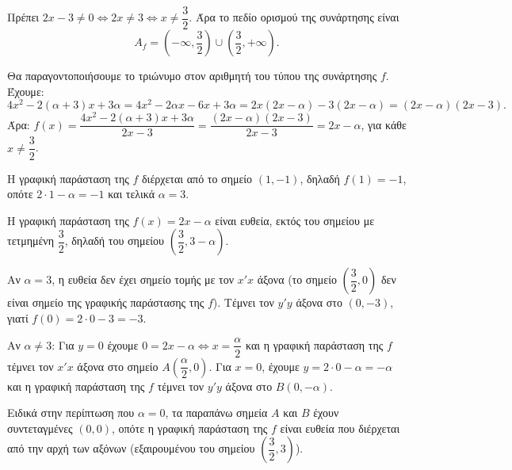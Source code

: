 
\begin{alist}
\item Πρέπει $2x - 3 \ne 0 \Leftrightarrow 2x \ne 3 \Leftrightarrow x \ne \dfrac{3}{2}$. Άρα το πεδίο ορισμού της συνάρτησης είναι
\[A_f = \left(-\infty, \dfrac{3}{2}\right) \cup \left(\dfrac{3}{2}, +\infty\right).\]

\item Θα παραγοντοποιήσουμε το τριώνυμο στον αριθμητή του τύπου της συνάρτησης $f$.
Έχουμε:
\[4x^2 - 2(\alpha + 3)x + 3\alpha = 4x^2 - 2\alpha x - 6x + 3\alpha = 2x(2x - \alpha) - 3(2x - \alpha) = (2x - \alpha)(2x - 3).\]
Άρα:
$f(x) = \dfrac{4x^2 - 2(\alpha + 3)x + 3\alpha}{2x - 3} = \dfrac{(2x - \alpha)(2x - 3)}{2x - 3} = 2x - \alpha$, για κάθε $x \ne \dfrac{3}{2}$.

\item Η γραφική παράσταση της $f$ διέρχεται από το σημείο $(1, -1)$, δηλαδή $f(1) = -1$, οπότε
$2 \cdot 1 - \alpha = -1$ και τελικά $\alpha = 3$.

\item Η γραφική παράσταση της $f(x) = 2x - \alpha$ είναι ευθεία, εκτός του σημείου με τετμημένη
$\dfrac{3}{2}$, δηλαδή του σημείου $\left(\dfrac{3}{2}, 3 - \alpha\right)$.

Αν $\alpha = 3$, η ευθεία δεν έχει σημείο τομής με τον $x'x$ άξονα (το σημείο $\left(\dfrac{3}{2}, 0\right)$ δεν είναι
σημείο της γραφικής παράστασης της $f$). Τέμνει τον $y'y$ άξονα στο $(0, -3)$, γιατί
$f(0) = 2 \cdot 0 - 3 = -3$.

Αν $\alpha \ne 3$:
Για $y = 0$ έχουμε $0 = 2x - \alpha \Leftrightarrow x = \dfrac{\alpha}{2}$ και η γραφική παράσταση της $f$ τέμνει τον $x'x$
άξονα στο σημείο $A\left(\dfrac{\alpha}{2}, 0\right)$.
Για $x = 0$, έχουμε $y = 2 \cdot 0 - \alpha = -\alpha$ και η γραφική παράσταση της $f$ τέμνει τον $y'y$
άξονα στο $B(0, -\alpha)$.

Ειδικά στην περίπτωση που $\alpha = 0$, τα παραπάνω σημεία $A$ και $B$ έχουν συντεταγμένες
$(0, 0)$, οπότε η γραφική παράσταση της $f$ είναι ευθεία που διέρχεται από την αρχή των
αξόνων (εξαιρουμένου του σημείου $\left(\dfrac{3}{2}, 3\right)$).
\end{alist}


